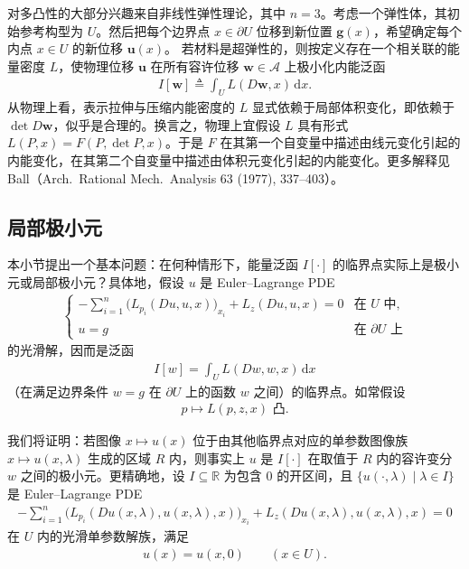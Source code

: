 \documentclass[../../main.tex]{subfiles}
\begin{document}
\begin{example}[弹性力学]\label{example:ch08-2-弹性}
对多凸性的大部分兴趣来自非线性弹性理论，其中 $n=3$。考虑一个弹性体，其初始参考构型为 $U$。然后把每个边界点 $x\in\partial U$ 位移到新位置 $\mathbf{g}(x)$，希望确定每个内点 $x\in U$ 的新位移 $\mathbf{u}(x)$。
若材料是超弹性的，则按定义存在一个相关联的能量密度 $L$，使物理位移 $\mathbf{u}$ 在所有容许位移 $\mathbf{w}\in\mathcal{A}$ 上极小化内能泛函
\begin{align*}
I[\mathbf{w}]\triangleq\int_U L(D\mathbf{w},x)\,\mathrm{d}x.
\end{align*}
从物理上看，表示拉伸与压缩内能密度的 $L$ 显式依赖于局部体积变化，即依赖于 $\det D\mathbf{w}$，似乎是合理的。换言之，物理上宜假设 $L$ 具有形式 $L(P,x)=F(P,\det P,x)$。于是 $F$ 在其第一个自变量中描述由线元变化引起的内能变化，在其第二个自变量中描述由体积元变化引起的内能变化。更多解释见 Ball（Arch.\ Rational Mech.\ Analysis 63 (1977), 337--403）。
\end{example}

\subsection{局部极小元}\label{subsection:ch08-2-5-局部极小元}

本小节提出一个基本问题：在何种情形下，能量泛函 $I[\cdot]$ 的临界点实际上是极小元或局部极小元？具体地，假设 $u$ 是 Euler--Lagrange PDE
\begin{align}
\begin{cases}
-\sum_{i=1}^n\big(L_{p_i}(Du,u,x)\big)_{x_i}+L_z(Du,u,x)=0&\text{在 }U\text{ 中},\\
u=g&\text{在 }\partial U\text{ 上}
\end{cases}\label{align:ch08-2-eq55}
\end{align}
的光滑解，因而是泛函
\begin{align*}
I[w]=\int_U L(Dw,w,x)\,\mathrm{d}x
\end{align*}
（在满足边界条件 $w=g$ 在 $\partial U$ 上的函数 $w$ 之间）的临界点。如常假设
\begin{align*}
p\mapsto L(p,z,x)\text{ 凸}.
\end{align*}

我们将证明：若图像 $x\mapsto u(x)$ 位于由其他临界点对应的单参数图像族 $x\mapsto u(x,\lambda)$ 生成的区域 $R$ 内，则事实上 $u$ 是 $I[\cdot]$ 在取值于 $R$ 内的容许变分 $w$ 之间的极小元。更精确地，设 $I\subseteq\mathbb{R}$ 为包含 $0$ 的开区间，且 $\{u(\cdot,\lambda)\mid\lambda\in I\}$ 是 Euler--Lagrange PDE
\begin{align}
-\sum_{i=1}^n\big(L_{p_i}(Du(x,\lambda),u(x,\lambda),x)\big)_{x_i}+L_z(Du(x,\lambda),u(x,\lambda),x)=0\label{align:ch08-2-eq56}
\end{align}
在 $U$ 内的光滑单参数解族，满足
\begin{align}
u(x)=u(x,0)\qquad (x\in U).\label{align:ch08-2-eq57}
\end{align}
\end{document}
